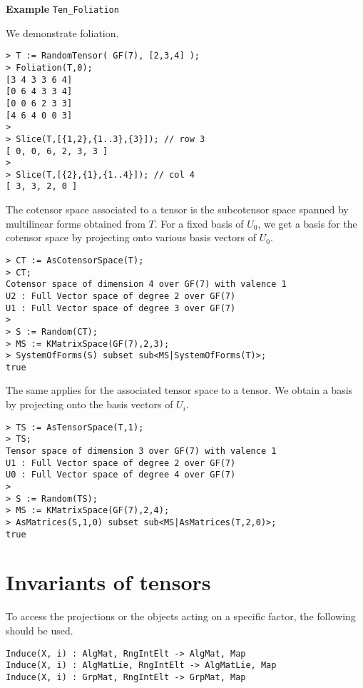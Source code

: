 \begin{framed} {\bf Example} {\tt Ten\_Foliation}\\
{\small We demonstrate foliation.
\begin{lstlisting}[frame=single,basicstyle=\ttfamily\color{black!30!
teal},backgroundcolor=\color{white!70!gray}]
> T := RandomTensor( GF(7), [2,3,4] );
> Foliation(T,0);
[3 4 3 3 6 4]
[0 6 4 3 3 4]
[0 0 6 2 3 3]
[4 6 4 0 0 3]
> 
> Slice(T,[{1,2},{1..3},{3}]); // row 3
[ 0, 0, 6, 2, 3, 3 ]
> 
> Slice(T,[{2},{1},{1..4}]); // col 4
[ 3, 3, 2, 0 ]
\end{lstlisting} 
The cotensor space associated to a tensor is the subcotensor space spanned by multilinear forms obtained from $T$.
For a fixed basis of $U_0$, we get a basis for the cotensor space by projecting onto various basis vectors of $U_0$.
\begin{lstlisting}[frame=single,basicstyle=\ttfamily\color{black!30!
teal},backgroundcolor=\color{white!70!gray}]
> CT := AsCotensorSpace(T);
> CT;
Cotensor space of dimension 4 over GF(7) with valence 1
U2 : Full Vector space of degree 2 over GF(7)
U1 : Full Vector space of degree 3 over GF(7)
> 
> S := Random(CT);
> MS := KMatrixSpace(GF(7),2,3);
> SystemOfForms(S) subset sub<MS|SystemOfForms(T)>;
true
\end{lstlisting}
The same applies for the associated tensor space to a tensor. 
We obtain a basis by projecting onto the basis vectors of $U_i$.
\begin{lstlisting}[frame=single,basicstyle=\ttfamily\color{black!30!
teal},backgroundcolor=\color{white!70!gray}]
> TS := AsTensorSpace(T,1);
> TS;
Tensor space of dimension 3 over GF(7) with valence 1
U1 : Full Vector space of degree 2 over GF(7)
U0 : Full Vector space of degree 4 over GF(7)
> 
> S := Random(TS);
> MS := KMatrixSpace(GF(7),2,4);
> AsMatrices(S,1,0) subset sub<MS|AsMatrices(T,2,0)>;
true
\end{lstlisting}
}
\end{framed}

\section{Invariants of tensors}

To access the projections or the objects acting on a specific factor, the 
following should be used.

\color{blue}
{\small \begin{verbatim}
Induce(X, i) : AlgMat, RngIntElt -> AlgMat, Map
Induce(X, i) : AlgMatLie, RngIntElt -> AlgMatLie, Map
Induce(X, i) : GrpMat, RngIntElt -> GrpMat, Map
\end{verbatim} }
\color{black}

